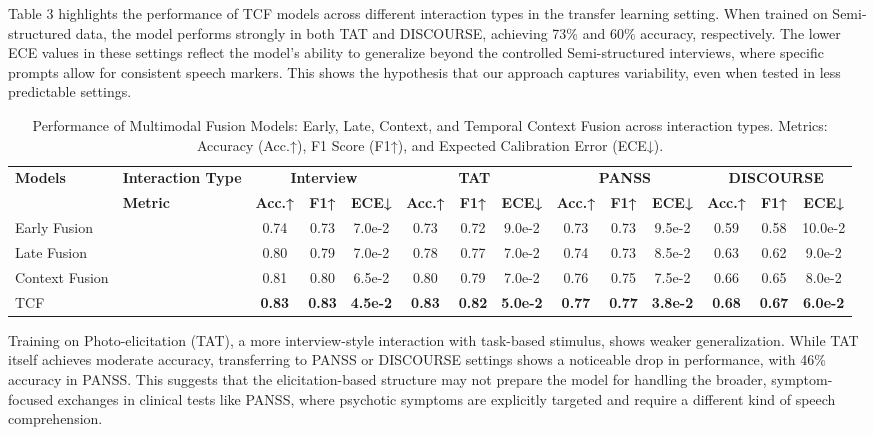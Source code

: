 \documentclass[9pt,a4paper]{rho-class/rho}
\begin{document}
Table 3 highlights the performance of TCF models across different interaction types in the transfer learning setting. When trained on Semi-structured data, the model performs strongly in both TAT and DISCOURSE, achieving 73\% and 60\% accuracy, respectively. The lower ECE values in these settings reflect the model’s ability to generalize beyond the controlled Semi-structured interviews, where specific prompts allow for consistent speech markers. This shows the hypothesis that our approach captures variability, even when tested in less predictable settings.


\begin{table*}[t]
\centering
{}
\begin{tabularx}{\textwidth}{lX|ccc|ccc|ccc|ccc}
\toprule
\textbf{Models} & \textbf{Interaction Type} & \multicolumn{3}{c}{\textbf{Interview}} & \multicolumn{3}{c}{\textbf{TAT}} & \multicolumn{3}{c}{\textbf{PANSS}} & \multicolumn{3}{c}{\textbf{DISCOURSE}} \\
                & \textbf{Metric} & \textbf{Acc.↑} & \textbf{F1↑} & \textbf{ECE↓} & \textbf{Acc.↑} & \textbf{F1↑} & \textbf{ECE↓} & \textbf{Acc.↑} & \textbf{F1↑} & \textbf{ECE↓} & \textbf{Acc.↑} & \textbf{F1↑} & \textbf{ECE↓} \\
\midrule
Early Fusion    & & 0.74 & 0.73 & 7.0e-2 & 0.73 & 0.72 & 9.0e-2 & 0.73 & 0.73 & 9.5e-2 & 0.59 & 0.58 & 10.0e-2 \\
Late Fusion     & & 0.80 & 0.79 & 7.0e-2 & 0.78 & 0.77 & 7.0e-2 & 0.74 & 0.73 & 8.5e-2 & 0.63 & 0.62 & 9.0e-2 \\
Context Fusion  & & 0.81 & 0.80 & 6.5e-2 & 0.80 & 0.79 & 7.0e-2 & 0.76 & 0.75 & 7.5e-2 & 0.66 & 0.65 & 8.0e-2 \\
TCF      & & \textbf{0.83} & \textbf{0.83} & \textbf{4.5e-2} & \textbf{0.83} & \textbf{0.82} & \textbf{5.0e-2} & \textbf{0.77} & \textbf{0.77} & \textbf{3.8e-2} & \textbf{0.68} & \textbf{0.67} & \textbf{6.0e-2} \\
\bottomrule
\end{tabularx}
\caption{Performance of Multimodal Fusion Models: Early, Late, Context, and Temporal Context Fusion across interaction types. Metrics: Accuracy (Acc.↑), F1 Score (F1↑), and Expected Calibration Error (ECE↓).}
\end{table*}

Training on Photo-elicitation (TAT), a more interview-style interaction with task-based stimulus, shows weaker generalization. While TAT itself achieves moderate accuracy, transferring to PANSS or DISCOURSE settings shows a noticeable drop in performance, with 46\% accuracy in PANSS. This suggests that the elicitation-based structure may not prepare the model for handling the broader, symptom-focused exchanges in clinical tests like PANSS, where psychotic symptoms are explicitly targeted and require a different kind of speech comprehension.
\end{document}
